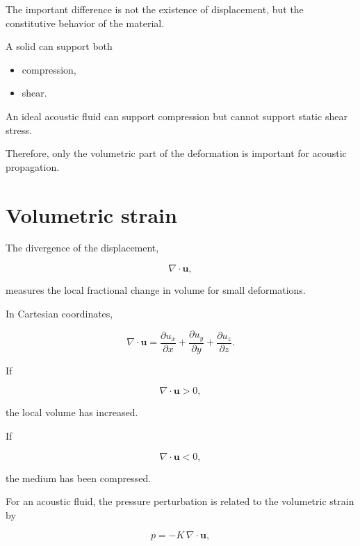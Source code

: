 \documentclass[11pt]{article}
\begin{document}
The important difference is not the existence of displacement, but the constitutive behavior of the material.

A solid can support both

\begin{itemize}
    \item compression,
    \item shear.
\end{itemize}

An ideal acoustic fluid can support compression but cannot support static shear stress.

Therefore, only the volumetric part of the deformation is important for acoustic propagation.

\section{Volumetric strain}

The divergence of the displacement,

\begin{equation}
    \nabla\cdot\bm{u},
\end{equation}

measures the local fractional change in volume for small deformations.

In Cartesian coordinates,

\begin{equation}
    \nabla\cdot\bm{u}
    =
    \frac{\partial u_x}{\partial x}
    +
    \frac{\partial u_y}{\partial y}
    +
    \frac{\partial u_z}{\partial z}.
\end{equation}

If

\begin{equation}
    \nabla\cdot\bm{u}>0,
\end{equation}

the local volume has increased.

If

\begin{equation}
    \nabla\cdot\bm{u}<0,
\end{equation}

the medium has been compressed.

For an acoustic fluid, the pressure perturbation is related to the volumetric strain by

\begin{equation}
    \boxed{
    p=-K\,\nabla\cdot\bm{u},
    }
\end{equation}
\end{document}
